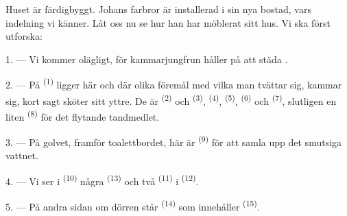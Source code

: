 %

\VUsaut{6.0mm}
\VUsaut{1.4mm}
\VUsaut{0.4mm}
\VUsaut{2.2mm}

Huset är färdigbyggt. Johans farbror är installerad i sin nya bostad, vars indelning vi
känner. Låt oss nu se hur han har möblerat sitt hus. Vi ska först utforska:

\VUsaut{3.0mm}

1. --- Vi kommer olägligt, för kammarjungfrun håller på att städa .

2. --- På  \textsuperscript{(1)} ligger här och där olika föremål med
vilka man tvättar sig, kammar sig, kort sagt sköter sitt yttre. De är
 \textsuperscript{(2)} och 
\textsuperscript{(3)},  \textsuperscript{(4)}, 
\textsuperscript{(5)},  \textsuperscript{(6)} och
 \textsuperscript{(7)}, slutligen en liten 
\textsuperscript{(8)} för det flytande tandmedlet.

3. --- På golvet, framför toalettbordet, här är  \textsuperscript{(9)} för att
samla upp det smutsiga vattnet.

4. --- Vi ser i  \textsuperscript{(10)} några
 \textsuperscript{(13)} och två 
\textsuperscript{(11)} i  \textsuperscript{(12)}.

5. --- På andra sidan om dörren står  \textsuperscript{(14)} som
innehåller  \textsuperscript{(15)}.

